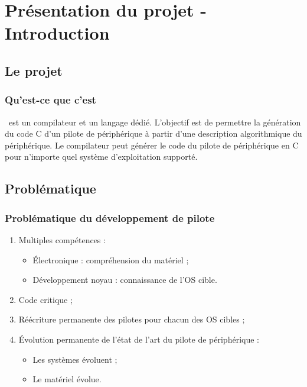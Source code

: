 \documentclass[]{beamer}
\title{\rtx}
\subtitle{Un DSL et son compilateur}
\author{David Pineau \\ \texttt{<david@lse.epitech.eu>}}
\begin{document}
\begin{frame}
\titlepage
\end{frame}



\section{Présentation du projet - Introduction}

\subsection{Le projet}
\begin{frame}
\frametitle{Qu'est-ce que c'est}
\rtx\ est un compilateur et un langage dédié. L'objectif est de permettre la
génération du code C d'un pilote de périphérique à partir d'une description
algorithmique du périphérique. Le compilateur peut générer le code du pilote de
périphérique en C pour n'importe quel système d'exploitation supporté.
\end{frame}

\subsection{Problématique}
\begin{frame}
\frametitle{Problématique du développement de pilote}
\begin{enumerate}[<+->]
    \item Multiples compétences :
        \begin{itemize}[<1->]
            \item Électronique : compréhension du matériel ;
            \item Développement noyau : connaissance de l'OS cible.
        \end{itemize}
    \item Code critique ;
    \item Réécriture permanente des pilotes pour chacun des OS cibles ;
    \item Évolution permanente de l'état de l'art du pilote de périphérique :
        \begin{itemize}
            \item Les systèmes évoluent ;
            \item Le matériel évolue.
        \end{itemize}
\end{enumerate}
\end{frame}
\end{document}
